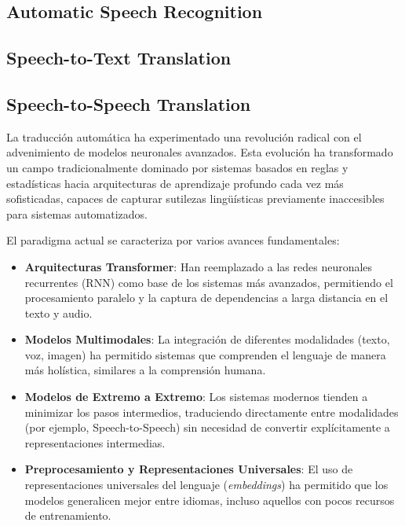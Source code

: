 \subsection{Automatic Speech Recognition}

\subsection{Speech-to-Text Translation}
\subsection{Speech-to-Speech Translation}

La traducción automática ha experimentado una revolución radical con el advenimiento de modelos neuronales avanzados. Esta evolución ha transformado un campo tradicionalmente dominado por sistemas basados en reglas y estadísticas hacia arquitecturas de aprendizaje profundo cada vez más sofisticadas, capaces de capturar sutilezas lingüísticas previamente inaccesibles para sistemas automatizados.

El paradigma actual se caracteriza por varios avances fundamentales:

\begin{itemize}
    \item \textbf{Arquitecturas Transformer}: Han reemplazado a las redes neuronales recurrentes (RNN) como base de los sistemas más avanzados, permitiendo el procesamiento paralelo y la captura de dependencias a larga distancia en el texto y audio.
    
    \item \textbf{Modelos Multimodales}: La integración de diferentes modalidades (texto, voz, imagen) ha permitido sistemas que comprenden el lenguaje de manera más holística, similares a la comprensión humana.
    
    \item \textbf{Modelos de Extremo a Extremo}: Los sistemas modernos tienden a minimizar los pasos intermedios, traduciendo directamente entre modalidades (por ejemplo, Speech-to-Speech) sin necesidad de convertir explícitamente a representaciones intermedias.
    
    \item \textbf{Preprocesamiento y Representaciones Universales}: El uso de representaciones universales del lenguaje (\textit{embeddings}) ha permitido que los modelos generalicen mejor entre idiomas, incluso aquellos con pocos recursos de entrenamiento.
\end{itemize}

